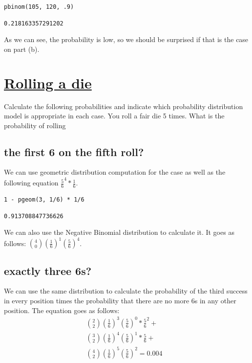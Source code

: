 \documentclass[11pt]{article}
\begin{document}
\begin{verbatim}
pbinom(105, 120, .9)
\end{verbatim}

\begin{verbatim}
0.218163357291202
\end{verbatim}


As we can see, the probability is low, so we should be surprised if that is the case on part (b).

\section{\underline{Rolling a die}}
\label{sec:org985183c}
Calculate the following probabilities and indicate which probability distribution model is appropriate in each case. You roll a fair die 5 times. What is the probability of rolling 

\subsection{the first 6 on the fifth roll?}
\label{sec:org39addb0}
We can use geometric distribution computation for the case as well as the following equation \(\frac{5}{6}^4*\frac{1}{6}\).

\begin{verbatim}
1 - pgeom(3, 1/6) * 1/6
\end{verbatim}

\begin{verbatim}
0.913708847736626
\end{verbatim}


We can also use the Negative Binomial distribution to calculate it. It goes as follows: \(\binom{4}{0}(\frac{1}{6})^{1}(\frac{5}{6})^{4}\).

\subsection{exactly three 6s?}
\label{sec:orga57e106}
We can use the same distribution to calculate the probability of the third success in every position times the probability that there are no more 6s in any other position. The equation goes as follows: 
\begin{eqnarray*}
   \binom{2}{2}(\frac{1}{6})^{3}(\frac{5}{6})^{0} * \frac{5}{6}^2 +& \\
   \binom{3}{2}(\frac{1}{6})^{4}(\frac{5}{6})^{1} * \frac{5}{6} +&\\
   \binom{4}{2}(\frac{1}{6})^{5}(\frac{5}{6})^{2} = 0.004\\
 \end{eqnarray*}
\end{document}
